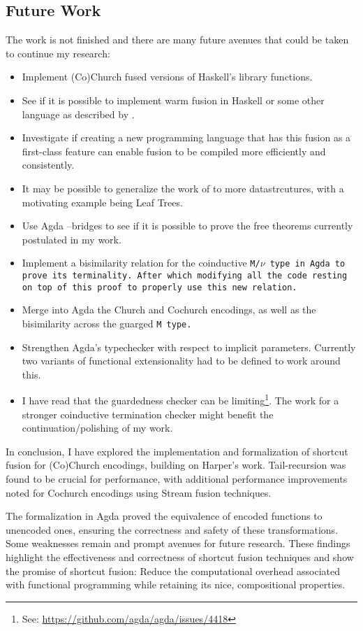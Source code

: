 \subsection*{Future Work}
The work is not finished and there are many future avenues that could be taken to continue my research:
\begin{itemize}[noitemsep]
    \item Implement (Co)Church fused versions of Haskell's library functions.
    \item See if it is possible to implement warm fusion in Haskell or some other language as described by \cite{Launchbury1995}.
    \item Investigate if creating a new programming language that has this fusion as a first-class feature can enable fusion to be compiled more efficiently and consistently.
    \item It may be possible to generalize the work of \cite{Coutts2007} to more datastrcutures, with a motivating example being Leaf Trees.
    \item Use Agda --bridges to see if it is possible to prove the free theorems currently postulated in my work.
    \item Implement a bisimilarity relation for the coinductive \tt{M}/$\nu$  type in Agda to prove its terminality. After which modifying all the code resting on top of this proof to properly use this new relation.
    \item Merge into Agda the Church and Cochurch encodings, as well as the bisimilarity across the guarged \tt{M} type.
    \item Strengthen Agda's typechecker with respect to implicit parameters. Currently two variants of functional extensionality had to be defined to work around this.
    \item I have read that the guardedness checker can be limiting\footnote{See: \url{https://github.com/agda/agda/issues/4418}}. The work for a stronger coinductive termination checker might benefit the continuation/polishing of my work.
\end{itemize}
In conclusion, I have explored the implementation and formalization of shortcut fusion for (Co)Church encodings, building on Harper's work.
Tail-recursion was found to be crucial for performance, with additional performance improvements noted for Cochurch encodings using Stream fusion techniques.

The formalization in Agda proved the equivalence of encoded functions to unencoded ones, ensuring the correctness and safety of these transformations.
Some weaknesses remain and prompt avenues for future research.
These findings highlight the effectiveness and correctness of shortcut fusion techniques and show the promise of shortcut fusion: Reduce the computational overhead associated with functional programming while retaining its nice, compositional properties.

